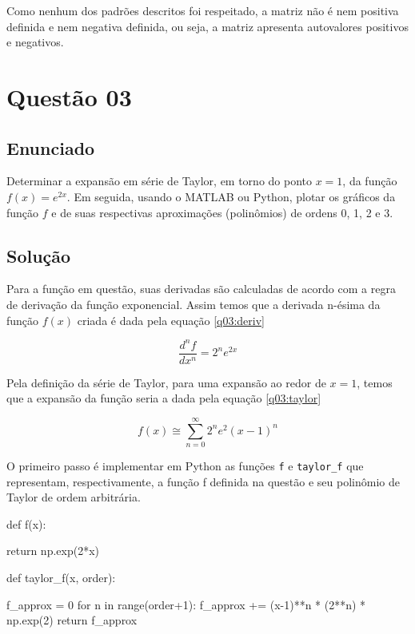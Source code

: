 \documentclass[10pt, a4paper]{article}
\begin{document}
Como nenhum dos padrões descritos foi respeitado, a matriz não é nem 
positiva definida e nem negativa definida, 
ou seja, a matriz apresenta autovalores positivos e negativos.

\section[q03]{Questão 03}\label{q03}

\subsection[q03:enunciado]{Enunciado}

Determinar a expansão em série de Taylor, em torno do ponto $x = 1$, 
da função $f(x) = e^{2x}$. Em seguida, usando o MATLAB ou Python, 
plotar os gráficos da função $f$ e de suas respectivas aproximações
(polinômios) de ordens 0, 1, 2 e 3.

\subsection[q03:solucao]{Solução}

Para a função em questão, suas derivadas são calculadas de acordo com a regra de 
derivação da função exponencial. Assim temos que a derivada n-ésima da função 
$f(x)$ criada é dada pela equação \cref{q03:deriv}

\begin{equation}\label{q03:deriv}
    \frac{d^nf}{dx^n} = 2^n e^{2x}
\end{equation}

Pela definição da série de Taylor, para uma expansão ao redor de $x = 1$, temos 
que a expansão da função seria a dada pela equação \cref{q03:taylor}

\begin{equation}\label{q03:taylor}
    f(x) \cong \sum^{\infty}_{n=0} 2^n e^2 (x-1)^n
\end{equation}

O primeiro passo é implementar em Python as funções {\tt f} e {\tt taylor\_f} que 
representam, respectivamente, a função f definida na questão e seu polinômio 
de Taylor de ordem arbitrária.

\begin{python}
def f(x):

return np.exp(2*x)

def taylor_f(x, order):

f_approx = 0
for n in range(order+1):
    f_approx += (x-1)**n * (2**n) * np.exp(2)
return f_approx
\end{python}
\end{document}
